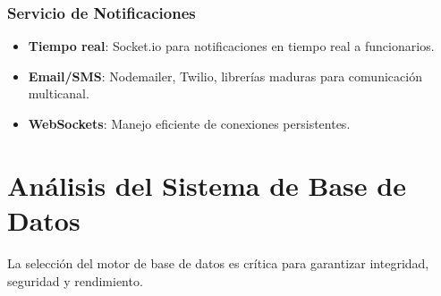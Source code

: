 \subsubsection{Servicio de Notificaciones}

\begin{itemize}
    \item \textbf{Tiempo real}: Socket.io para notificaciones en tiempo real a funcionarios.
    \item \textbf{Email/SMS}: Nodemailer, Twilio, librerías maduras para comunicación multicanal.
    \item \textbf{WebSockets}: Manejo eficiente de conexiones persistentes.
\end{itemize}

\section{Análisis del Sistema de Base de Datos}

La selección del motor de base de datos es crítica para garantizar integridad, seguridad y rendimiento.

